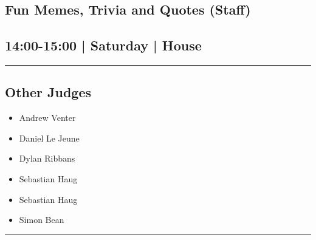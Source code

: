 \documentclass[10pt, A5]{article}
\begin{document}
\begin{framed}
\begin{minipage}{\textwidth}
\begin{multicols}{2}
		\vfill\null

		\end{multicols}
\end{minipage}
\end{framed}
        \begin{framed}
        \begin{minipage}{\textwidth}

        \setcounter{section}{13}
        \section{Fun Memes, Trivia and Quotes (Staff)}
        \subsection*{14:00-15:00 | Saturday | House}

        \vspace{0.25cm}
        \hrule
        \vspace{0.25cm}


        \subsection*{Other Judges}
                    

        	\begin{multicols}{2}

		\begin{itemize}
									\item Andrew Venter
									\item Daniel Le Jeune
									\item Dylan Ribbans
									\item Sebastian Haug
						\end{itemize}

		\vfill\null
		\columnbreak

		\begin{itemize}
									\item Sebastian Haug
									\item Simon Bean
						\end{itemize}

		\vfill\null

		\end{multicols}

    \vspace{0.25cm}
        \hrule
        \vspace{0.25cm}

        \begin{multicols}{2}


\end{multicols}
\end{minipage}
\end{framed}
\end{document}
